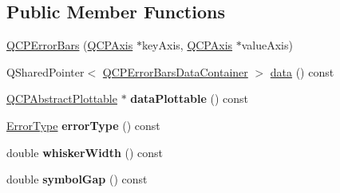 \subsection*{Public Member Functions}
\begin{DoxyCompactItemize}
\item 
\hyperlink{class_q_c_p_error_bars_a5cdcc33e5f173780c3d657e96216e5c1}{Q\+C\+P\+Error\+Bars} (\hyperlink{class_q_c_p_axis}{Q\+C\+P\+Axis} $\ast$key\+Axis, \hyperlink{class_q_c_p_axis}{Q\+C\+P\+Axis} $\ast$value\+Axis)
\item 
Q\+Shared\+Pointer$<$ \hyperlink{class_q_vector}{Q\+C\+P\+Error\+Bars\+Data\+Container} $>$ \hyperlink{class_q_c_p_error_bars_ade69711ef3f9ec10e77d121fa2ba773b}{data} () const 
\item 
\hyperlink{class_q_c_p_abstract_plottable}{Q\+C\+P\+Abstract\+Plottable} $\ast$ {\bfseries data\+Plottable} () const \hypertarget{class_q_c_p_error_bars_ad9e85b60a45022c1c3c88dd88693b465}{}\label{class_q_c_p_error_bars_ad9e85b60a45022c1c3c88dd88693b465}

\item 
\hyperlink{class_q_c_p_error_bars_a95f0220f11a72648b96480a85ce26474}{Error\+Type} {\bfseries error\+Type} () const \hypertarget{class_q_c_p_error_bars_a05020eba90982b7d1308560edc3ff59f}{}\label{class_q_c_p_error_bars_a05020eba90982b7d1308560edc3ff59f}

\item 
double {\bfseries whisker\+Width} () const \hypertarget{class_q_c_p_error_bars_acb67e100878a60bbe3118baf21d3b2e9}{}\label{class_q_c_p_error_bars_acb67e100878a60bbe3118baf21d3b2e9}

\item 
double {\bfseries symbol\+Gap} () const \hypertarget{class_q_c_p_error_bars_a5987a45043d4cc6425438ce2b96b6972}{}\label{class_q_c_p_error_bars_a5987a45043d4cc6425438ce2b96b6972}


\end{DoxyCompactItemize}
